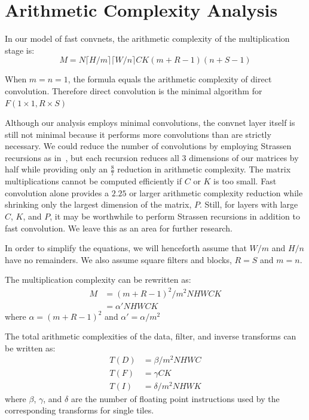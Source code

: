 \documentclass[10pt,twocolumn,letterpaper]{article}
\begin{document}
\section{Arithmetic Complexity Analysis}

In our model of fast convnets, the arithmetic complexity of the multiplication stage is:
\begin{equation}
M = N \lceil H/m \rceil \lceil W/n \rceil CK(m+R-1)(n+S-1)
\end{equation}

When $m=n=1$, the formula equals the arithmetic complexity of direct convolution. Therefore direct convolution is the minimal algorithm for $F(1 \times 1, R \times S)$

Although our analysis employs minimal convolutions, the convnet layer itself is still not minimal because it  performs more convolutions than are strictly necessary. We could reduce the number of convolutions by employing Strassen recursions as in~\cite{cong2014minimizing}, but each recursion reduces all 3 dimensions of our matrices by half while providing only an $\frac{8}{7}$ reduction in arithmetic complexity. The matrix multiplications cannot be computed efficiently if $C$ or $K$ is too small. Fast convolution alone provides a $2.25$ or larger arithmetic complexity reduction while shrinking only the largest dimension of the matrix, $P$. Still, for layers with large $C$, $K$, and $P$, it may be worthwhile to perform Strassen recursions in addition to fast convolution. We leave this as an area for further research.
 
In order to simplify the equations, we will henceforth assume that $W/m$ and $H/n$ have no remainders. We also assume square filters and blocks, $R=S$ and $m=n$.
 
The multiplication complexity can be rewritten as:
\begin{equation}
\begin{split}
M &= (m+R-1)^2/m^2 NHWCK \\
&= \alpha' NHWCK 
\end{split}
\end{equation}
where $\alpha=(m+R-1)^2$ and $\alpha' =\alpha/m^2$
 
The total arithmetic complexities of the data, filter, and inverse transforms can be written as:
\begin{equation}
\begin{split}
T(D) &= \beta/m^2 NHWC \\
T(F) &= \gamma CK \\
T(I) &= \delta/m^2  NHWK
\end{split}
\end{equation}
where $\beta$, $\gamma$, and $\delta$ are the number of floating point instructions used by the corresponding transforms for single tiles.
 
\end{document}
